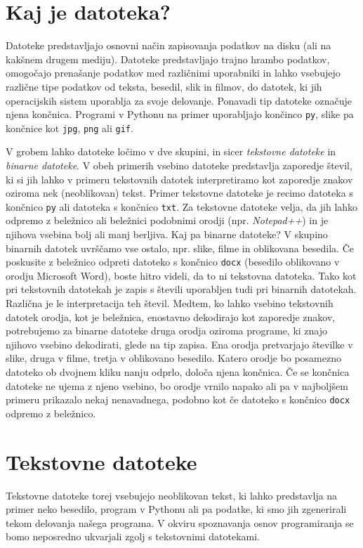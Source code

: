\section{Kaj je datoteka?}

Datoteke predstavljajo osnovni način zapisovanja podatkov na disku (ali na kakšnem drugem mediju). Datoteke predstavljajo trajno hrambo podatkov, omogočajo prenašanje podatkov med različnimi uporabniki in lahko vsebujejo različne tipe podatkov od teksta, besedil, slik in filmov, do datotek, ki jih operacijskih sistem uporablja za svoje delovanje. Ponavadi tip datoteke označuje njena končnica. Programi v Pythonu na primer uporabljajo končinco \texttt{py}, slike pa končnice kot \texttt{jpg}, \texttt{png} ali \texttt{gif}. 

V grobem lahko datoteke ločimo v dve skupini, in sicer \emph{tekstovne datoteke} in \emph{binarne datoteke}. V obeh primerih vsebino datoteke predstavlja zaporedje števil, ki si jih lahko v primeru tekstovnih datotek interpretiramo kot zaporedje znakov oziroma nek (neoblikovan) tekst. Primer tekstovne datoteke je recimo datoteka s končnico \texttt{py} ali datoteka s končnico \texttt{txt}. Za tekstovne datoteke velja, da jih lahko odpremo z beležnico ali beležnici podobnimi orodji (npr. \emph{Notepad++}) in je njihova vsebina bolj ali manj berljiva. Kaj pa binarne datoteke? V skupino binarnih datotek uvrščamo vse ostalo, npr. slike, filme in oblikovana besedila. Če poskusite z beležnico odpreti datoteko s končnico \texttt{docx} (besedilo oblikovano v orodju Microsoft Word), boste hitro videli, da to ni tekstovna datoteka. Tako kot pri tekstovnih datotekah je zapis s števili uporabljen tudi pri binarnih datotekah. Različna je le interpretacija teh števil. Medtem, ko lahko vsebino tekstovnih datotek orodja, kot je beležnica, enostavno dekodirajo kot zaporedje znakov, potrebujemo za binarne datoteke druga orodja oziroma programe, ki znajo njihovo vsebino dekodirati, glede na tip zapisa. Ena orodja pretvarjajo številke v slike, druga v filme, tretja v oblikovano besedilo. Katero orodje bo posamezno datoteko ob dvojnem kliku nanju odprlo, določa njena končnica. Če se končnica datoteke ne ujema z njeno vsebino, bo orodje vrnilo napako ali pa v najboljšem primeru prikazalo nekaj nenavadnega, podobno kot če datoteko s končnico \texttt{docx} odpremo z beležnico. 

\section{Tekstovne datoteke}
Tekstovne datoteke torej vsebujejo neoblikovan tekst, ki lahko predstavlja na primer neko besedilo, program v Pythonu ali pa podatke, ki smo jih zgenerirali tekom delovanja našega programa. V okviru spoznavanja osnov programiranja se bomo neposredno ukvarjali zgolj s tekstovnimi datotekami. 

